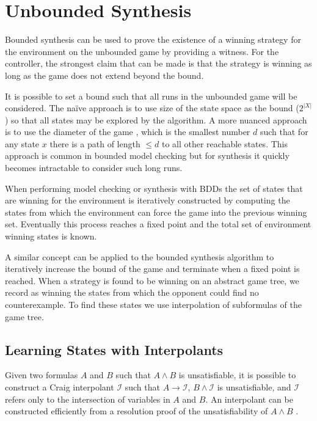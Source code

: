 \documentclass{llncs}
\begin{document}
\section{Unbounded Synthesis}

\label{sect:unbounded}

Bounded synthesis can be used to prove the existence of a winning strategy for
the environment on the unbounded game by providing a witness. For the
controller, the strongest claim that can be made is that the strategy is
winning as long as the game does not extend beyond the bound.

It is possible to set a bound such that all runs in the unbounded game will be
considered. The na\"ive approach is to use size of the state space as the bound
($2^{|X|}$) so that all states may be explored by the algorithm. A more nuanced
approach is to use the diameter of the game \cite{biere1999}, which is the
smallest number $d$ such that for any state $x$ there is a path of length $\leq
d$ to all other reachable states. This approach is common in bounded model
checking but for synthesis it quickly becomes intractable to consider such long
runs.

When performing model checking or synthesis with BDDs \cite{burch1990} the set
of states that are winning for the environment is iteratively constructed by
computing the states from which the environment can force the game into the
previous winning set. Eventually this process reaches a fixed point and the
total set of environment winning states is known.

A similar concept can be applied to the bounded synthesis algorithm to
iteratively increase the bound of the game and terminate when a fixed point is
reached. When a strategy is found to be winning on an abstract game tree, we
record as winning the states from which the opponent could find no
counterexample. To find these states we use interpolation of subformulas of the
game tree.

\subsection{Learning States with Interpolants}

Given two formulas $A$ and $B$ such that $A \land B$ is unsatisfiable, it is
possible to construct a Craig interpolant\cite{craig1957} $\mathcal{I}$ such
that $A \to \mathcal{I}$, $B \land \mathcal{I}$ is unsatisfiable, and
$\mathcal{I}$ refers only to the intersection of variables in $A$ and $B$.  An
interpolant can be constructed efficiently from a resolution proof of the
unsatisfiability of $A \land B$ \cite{pudlak1997}.
\end{document}
